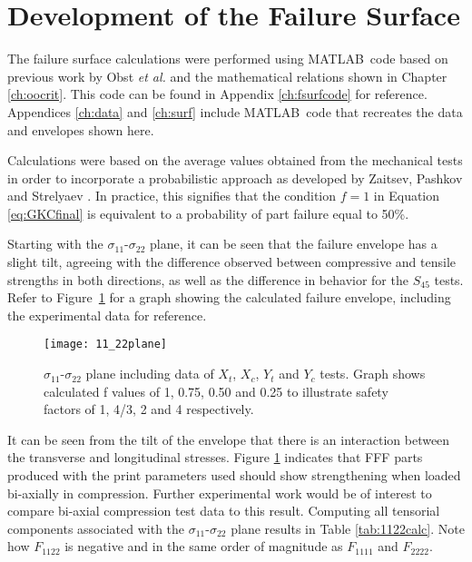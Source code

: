 \documentclass[main.tex]{subfiles}
\begin{document}
\section{Development of the Failure Surface} \label{sec:fsc}

The failure surface calculations were performed using MATLAB\textregistered~code based on previous work by Obst \emph{et al.} \cite{Obst2018} and the mathematical relations shown in Chapter \ref{ch:oocrit}. This code can be found in Appendix \ref{ch:fsurfcode} for reference. Appendices \ref{ch:data} and \ref{ch:surf} include MATLAB\textregistered~code that recreates the data and envelopes shown here.  

Calculations were based on the average values obtained from the mechanical tests in order to incorporate a probabilistic approach as developed by Zaitsev, Pashkov and Strelyaev \cite{Zaitsev1975}. In practice, this signifies that the condition $f=1$ in Equation \ref{eq:GKCfinal} is equivalent to a probability of part failure equal to 50\%.

Starting with the $\sigma_{11}$-$\sigma_{22}$ plane, it can be seen that the failure envelope has a slight tilt, agreeing with the difference observed between compressive and tensile strengths in both directions, as well as the difference in behavior for the $S_{45}$ tests. Refer to Figure~\ref{fig:1122plane} for a graph showing the calculated failure envelope, including the experimental data for reference.

\pagebreak

\begin{figure}[!htbp]
	\center
	\texttt{[image: 11\_22plane]}
	\captionsetup{justification=centering} %
	\caption[failure envelope in the $\sigma_{11}$-$\sigma_{22}$ plane]{$\sigma_{11}$-$\sigma_{22}$ plane including data of $X_t$, $X_c$, $Y_t$ and $Y_c$ tests. Graph shows calculated f values of 1, 0.75, 0.50 and 0.25 to illustrate safety factors of 1, 4/3, 2 and 4 respectively.} \label{fig:1122plane}
\end{figure}

It can be seen from the tilt of the envelope that there is an interaction between the transverse and longitudinal stresses. Figure \ref{fig:1122plane} indicates that FFF parts produced with the print parameters used should show strengthening when loaded bi-axially in compression. Further experimental work would be of interest to compare bi-axial compression test data to this result. Computing all tensorial components associated with the  $\sigma_{11}$-$\sigma_{22}$ plane results in Table \ref{tab:1122calc}. Note how $F_{1122}$ is negative and in the same order of magnitude as $F_{1111}$ and $F_{2222}$. 
\end{document}
